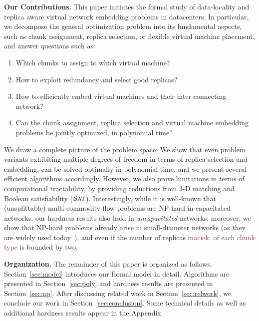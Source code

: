 \documentclass[9pt]{sigcomm-alternate}
\newcommand{\maciek}[1]{\textcolor{brown}{maciek: #1}}
\newcommand{\SAT}{\textsc{Sat}}
\begin{document}
\textbf{Our Contributions.}
This paper initiates the formal study of data-locality and replica aware virtual network embedding problems in datacenters.
In particular, we decompose the general optimization problem into its fundamental aspects, such as
chunk assignment, replica selection, or flexible virtual machine placement, and answer questions such as:
\begin{enumerate}
\item Which chunks to assign to which virtual machine?

\item How to exploit redundancy and select good replicas?

\item How to efficiently embed virtual machines and their inter-connecting network?

\item Can the chunk assignment, replica selection and virtual machine embedding problems be jointly optimized, in polynomial time?
\end{enumerate}

We draw a complete picture of the problem space: We show that
even problem variants exhibiting multiple degrees of freedom in terms of
replica selection and embedding,
can be solved optimally in polynomial time, and we present several efficient
algorithms accordingly. However, we also prove limitations in terms of
computational tractability, by providing reductions from 3-D matching
and Boolean satisfiability ($\SAT$). Interestingly,
while it is well-known that (unsplittable) multi-commodity flow
problems are NP-hard in capacitated networks, our hardness results also hold in \emph{uncapacitated}
networks; moreover, we show that NP-hard problems already arise in small-diameter networks (as they are
widely used today~\cite{fattree}),
and even if the number of replicas \maciek{of each chunk type} is bounded by two.


\textbf{Organization.}
The remainder of this paper is organized as follows.
Section~\ref{sec:model} introduces our formal model in detail.
Algorithms are presented in Section~\ref{sec:poly} and
hardness results are presented in Section~\ref{sec:np}.
After discussing related work in Section~\ref{sec:relwork},
we conclude our work in Section~\ref{sec:conclusion}.
Some technical details as well as additional hardness results
appear in the Appendix.
\end{document}

